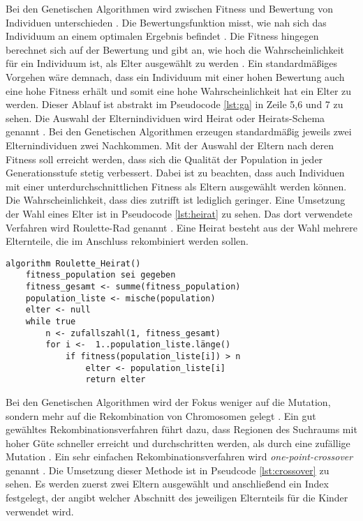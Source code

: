 Bei den Genetischen Algorithmen wird zwischen Fitness und Bewertung von Individuen unterschieden \cite[S. 196]{schoeneburg}. Die Bewertungsfunktion misst, wie nah sich das Individuum an einem optimalen Ergebnis befindet \cite[S. 196]{schoeneburg}.
Die Fitness hingegen berechnet sich auf der Bewertung und gibt an, wie hoch die Wahrscheinlichkeit für ein Individuum ist, als Elter ausgewählt zu werden \cite[S. 196]{schoeneburg}. Ein standardmäßiges Vorgehen wäre demnach, dass ein Individuum mit einer hohen Bewertung auch eine hohe Fitness erhält und somit eine hohe Wahrscheinlichkeit hat ein Elter zu werden.
Dieser Ablauf ist abstrakt im Pseudocode \ref{lst:ga} in Zeile 5,6 und 7 zu sehen.
Die Auswahl der Elternindividuen wird Heirat oder Heirats-Schema genannt \cite[S. 204]{schoeneburg}. Bei den Genetischen Algorithmen erzeugen standardmäßig jeweils zwei Elternindividuen zwei Nachkommen. 
Mit der Auswahl der Eltern nach deren Fitness soll erreicht werden, dass sich die Qualität der Population in jeder Generationsstufe stetig verbessert.
Dabei ist zu beachten, dass auch Individuen mit einer unterdurchschnittlichen Fitness als Eltern ausgewählt werden können. Die Wahrscheinlichkeit, dass dies zutrifft ist lediglich geringer.
Eine Umsetzung der Wahl eines Elter ist in Pseudocode \ref{lst:heirat} zu sehen. Das dort verwendete Verfahren wird Roulette-Rad genannt \cite[S. 204]{schoeneburg}. Eine Heirat besteht aus der Wahl mehrere Elternteile, die im Anschluss rekombiniert werden sollen.
\begin{lstlisting}[caption={Roulette-Rad}, firstnumber=1, captionpos=b,label=lst:heirat]
algorithm Roulette_Heirat()
	fitness_population sei gegeben
	fitness_gesamt <- summe(fitness_population)
	population_liste <- mische(population)
	elter <- null
	while true
		n <- zufallszahl(1, fitness_gesamt)
		for i <-  1..population_liste.länge()
			if fitness(population_liste[i]) > n
				elter <- population_liste[i]
				return elter
\end{lstlisting}
Bei den Genetischen Algorithmen wird der Fokus weniger auf die Mutation, sondern mehr auf die Rekombination von Chromosomen gelegt \cite[S. 198]{schoeneburg}. Ein gut gewähltes Rekombinationsverfahren führt dazu, dass Regionen des Suchraums mit hoher Güte schneller erreicht und durchschritten werden, als durch eine zufällige Mutation \cite[S. 198]{schoeneburg}.
Ein sehr einfachen Rekombinationsverfahren wird \textit{one-point-crossover} genannt \cite[S. 198]{schoeneburg}. Die Umsetzung dieser Methode ist in Pseudcode \ref{lst:crossover} zu sehen. Es werden zuerst zwei Eltern ausgewählt  und anschließend ein Index festgelegt, der angibt welcher Abschnitt des jeweiligen Elternteils für die Kinder verwendet wird.
